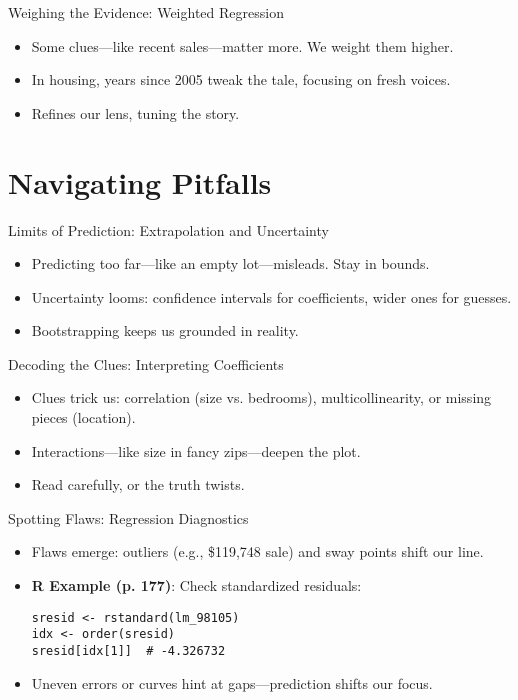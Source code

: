 \documentclass{beamer}
\begin{document}
\begin{frame}{Weighing the Evidence: Weighted Regression}
  \begin{itemize}
    \item Some clues—like recent sales—matter more. We weight them higher.
    \item In housing, years since 2005 tweak the tale, focusing on fresh voices.
    \item Refines our lens, tuning the story.
  \end{itemize}
\end{frame}

\section{Navigating Pitfalls}

\begin{frame}{Limits of Prediction: Extrapolation and Uncertainty}
  \begin{itemize}
    \item Predicting too far—like an empty lot—misleads. Stay in bounds.
    \item Uncertainty looms: confidence intervals for coefficients, wider ones for guesses.
    \item Bootstrapping keeps us grounded in reality.
  \end{itemize}
\end{frame}

\begin{frame}{Decoding the Clues: Interpreting Coefficients}
  \begin{itemize}
    \item Clues trick us: correlation (size vs. bedrooms), multicollinearity, or missing pieces (location).
    \item Interactions—like size in fancy zips—deepen the plot.
    \item Read carefully, or the truth twists.
  \end{itemize}
\end{frame}

\begin{frame}[fragile]{Spotting Flaws: Regression Diagnostics}
  \begin{itemize}
    \item Flaws emerge: outliers (e.g., \$119,748 sale) and sway points shift our line.
    \item \textbf{R Example (p. 177)}: Check standardized residuals:
      \begin{lstlisting}
sresid <- rstandard(lm_98105)
idx <- order(sresid)
sresid[idx[1]]  # -4.326732
      \end{lstlisting}
    \item Uneven errors or curves hint at gaps—prediction shifts our focus.
  \end{itemize}
\end{frame}
\end{document}
